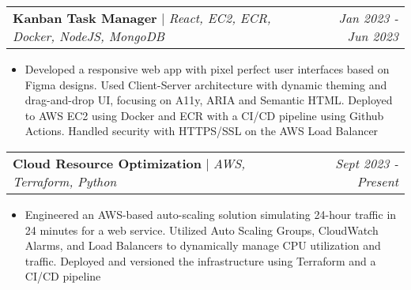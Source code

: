 \documentclass[letterpaper]{article}
\makeatletter
\newcommand{\resumeItemWithoutTitle}[1]{
  \item\small{
    {#1 \vspace{-2pt}}
  }
}
\newcommand{\projectHeading}[3]{
  \begin{tabular*}{\textwidth}{l@{\extracolsep{\fill}}r}
        \textbf{#1} 
        \hspace{-2pt} $\vert$ \hspace{-2pt} \small{\textit{#2}} 
        & 
        \textit{#3} \\
    \end{tabular*}\vspace{-2pt}
}
\newcommand{\projectHeadingWithLink}[4]{
  \begin{tabular*}{\textwidth}{l@{\extracolsep{\fill}}r}
        \textbf{\href{#4}{\color{blue}{#1}}}
        \hspace{-2pt} $\vert$ \hspace{-2pt} \small{\textit{#2}} 
        & 
        \textit{#3} \\
    \end{tabular*}\vspace{-2pt}
}
\newcommand{\resumeItemListStart}{\begin{itemize}}
\newcommand{\resumeItemListEnd}{\end{itemize}}
\makeatother
\begin{document}


\vspace{3pt}
\projectHeading {Kanban Task Manager}{React, EC2, ECR, Docker, NodeJS, MongoDB}{Jan 2023 - Jun 2023}
\resumeItemListStart
\resumeItemWithoutTitle{Developed a responsive web app with pixel perfect user interfaces based on Figma designs. Used Client-Server architecture with dynamic theming and drag-and-drop UI, focusing on A11y, ARIA and Semantic HTML. Deployed to AWS EC2 using Docker and ECR with a CI/CD pipeline using Github Actions. Handled security with HTTPS/SSL on the AWS Load Balancer}
\resumeItemListEnd






\vspace{3pt}
\projectHeading {Cloud Resource Optimization}{AWS, Terraform, Python}{Sept 2023 - Present}
\resumeItemListStart
\resumeItemWithoutTitle{Engineered an AWS-based auto-scaling solution simulating 24-hour traffic in 24 minutes for a web service. Utilized Auto Scaling Groups, CloudWatch Alarms, and Load Balancers to dynamically manage CPU utilization and traffic. Deployed and versioned the infrastructure using Terraform and a CI/CD pipeline}
\resumeItemListEnd


\end{document}

